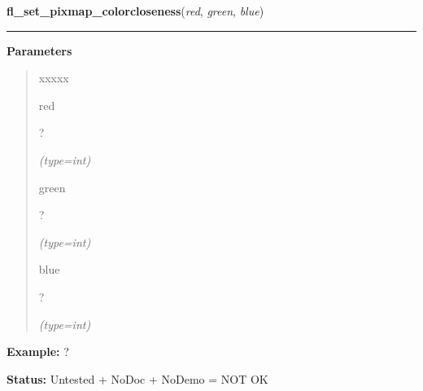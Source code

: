 \hspace{.8\funcindent}\begin{boxedminipage}{\funcwidth}

    \raggedright \textbf{fl\_set\_pixmap\_colorcloseness}(\textit{red}, \textit{green}, \textit{blue})

    \vspace{-1.5ex}

    \rule{\textwidth}{0.5\fboxrule}
\setlength{\parskip}{2ex}
\setlength{\parskip}{1ex}
      \textbf{Parameters}
      \vspace{-1ex}

      \begin{quote}
        \begin{Ventry}{xxxxx}

          \item[red]

          ?

            {\it (type=int)}

          \item[green]

          ?

            {\it (type=int)}

          \item[blue]

          ?

            {\it (type=int)}

        \end{Ventry}

      \end{quote}

\textbf{Example:} ?



\textbf{Status:} Untested + NoDoc + NoDemo = NOT OK



    \end{boxedminipage}

    \label{xformslib:flbitmap:fl_free_pixmap_pixmap}

    \vspace{0.5ex}


